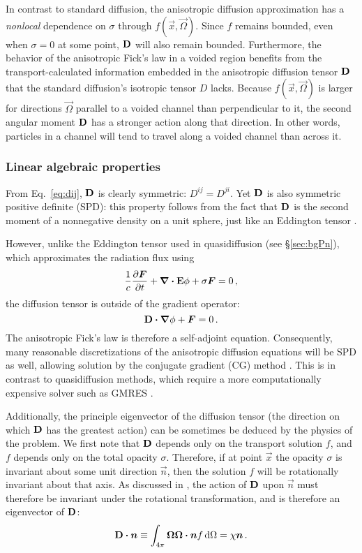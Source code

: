 In contrast to standard diffusion, the anisotropic diffusion approximation has
a \emph{nonlocal} dependence on $\sigma$ through $f(\vec{x}, \vec{\Omega})$.
Since $f$ remains bounded, even when $\sigma=0$ at some point, $\mathbf{D}$ will
also remain bounded. Furthermore, the behavior of the anisotropic Fick's law in
a voided region benefits from the transport-calculated information embedded in
the anisotropic diffusion tensor $\mathbf{D}$ that the standard diffusion's
isotropic tensor $D$ lacks. Because $f(\vec{x},\vec{\Omega})$ is larger for
directions $\vec{\Omega}$ parallel to a voided channel than perpendicular to it,
the second angular moment $\mathbf{D}$ has a stronger action along that direction.
In other words, particles in a channel will tend to travel along a voided
channel than across it.

\subsubsection{Linear algebraic properties}
From Eq.~\eqref{eq:dij}, $\mathbf{D}$ is clearly symmetric: $D^{ij}=D^{ji}$. Yet
$\mathbf{D}$ is also symmetric positive definite (SPD): this property follows from
the fact that $\mathbf{D}$ is the second moment of a nonnegative density on a unit
sphere, just like an Eddington tensor \cite{Lev1984}.

However, unlike the Eddington tensor used in quasidiffusion (see
\S\ref{sec:bgPn}), which approximates the radiation flux using
\begin{equation*}
  \frac{1}{c} \frac{\partial \bm{F}}{\partial t} + \bm{\nabla} \bm{\cdot} \mathbf{E} \phi + \sigma \bm{F} = 0\,,
\end{equation*}
the diffusion tensor is outside of the gradient operator:
\begin{equation*}
  \mathbf{D} \bm{\cdot} \bm{\nabla} \phi + \bm{F} = 0\,.
\end{equation*}
The anisotropic Fick's law is therefore a self-adjoint equation.  Consequently,
many
reasonable discretizations of the anisotropic diffusion equations will be SPD as
well, allowing solution by the conjugate gradient (CG) method \cite{Tre1997}.
This is in contrast to quasidiffusion methods, which
require a more computationally expensive solver such as GMRES \cite{War2003}.

Additionally, the principle eigenvector of the diffusion tensor (the direction
on which $\mathbf{D}$ has the greatest action) can be sometimes be deduced by
the physics of the problem. We first note that $\mathbf{D}$ depends only on the
transport solution $f$, and $f$ depends only on the total opacity $\sigma$.
Therefore, if at point $\vec{x}$ the opacity $\sigma$ is invariant about some
unit direction $\vec{n}$, then the solution $f$ will be rotationally invariant
about that axis. As discussed in \cite{Lev1984}, the action of $\mathbf{D}$ upon
$\vec{n}$ must therefore be invariant under the rotational transformation, and
is therefore an eigenvector of $\mathbf{D}$:
\begin{equation*}
  \mathbf{D} \bm{\cdot} \bm{n}
  \equiv \int_{4\pi} \bm{\Omega} \bm{\Omega} \bm{\cdot} \bm{n} f \mathop{}\!\mathrm{d} \Omega
  = \chi \bm{n} \,.
\end{equation*}

